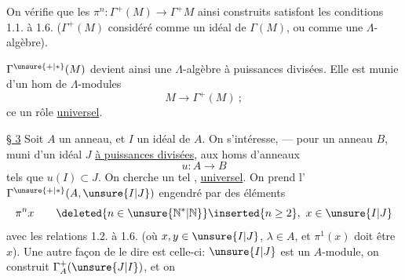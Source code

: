 On vérifie que les $\pi^n:\Gamma^+(M)\longrightarrow\Gamma^+M$ ainsi construits satisfont les conditions 1.1. à 1.6. ($\Gamma^+(M)$ considéré comme un idéal de $\Gamma(M)$, ou comme une $\Lambda$-algèbre).

$\Gamma^{\unsure{+|*}}(M)$ devient ainsi une $\Lambda$-algèbre à puissances divisées. Elle est munie d'un hom de $\Lambda$-modules
\[
M\longrightarrow\Gamma^+(M)\ ;
\]
ce   un rôle \uline{universel}.

\uline{§ 3} Soit $A$ un anneau, et $I$ un idéal de $A$. On s'intéresse, --- pour un anneau $B$, muni d'un idéal $J$ \uline{à puissances divisées}, aux homs d'anneaux
\[
u:A\longrightarrow B
\]
tels que $u(I)\subset J$. On cherche un tel , \uline{universel}. On prend l'  $\Gamma^{\unsure{+|*}}(A,\unsure{I|J})$ engendré par des éléments
\[
\pi^n x\qquad \deleted{n\in\unsure{\mathbb N^{*}|\mathbb N}}\inserted{n\geq2},\ x\in\unsure{I|J}
\]
avec les relations 1.2. à 1.6. (où  $x,y\in\unsure{I|J}$, $\lambda\in A$, et $\pi^1(x)$ doit être $x$). Une autre façon de le dire est celle-ci: $\unsure{I|J}$ est un $A$-module, on construit $\Gamma_A^+(\unsure{J|I})$, et on
